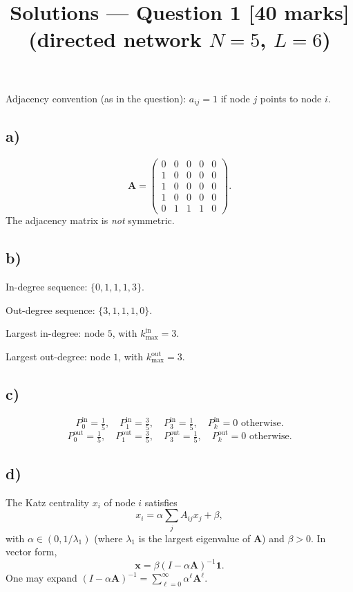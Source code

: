 \documentclass[11pt,a4paper]{article}
\title{Solutions --- Question 1 [40 marks]\\(directed network $N=5$, $L=6$)}
\author{}
\date{}
\begin{document}
\maketitle

\noindent
Adjacency convention (as in the question): $a_{ij} = 1$ if node $j$ points to node $i$.

\subsection*{a)}

\[
  \mathbf{A} =
  \begin{pmatrix}
    0 & 0 & 0 & 0 & 0 \\
    1 & 0 & 0 & 0 & 0 \\
    1 & 0 & 0 & 0 & 0 \\
    1 & 0 & 0 & 0 & 0 \\
    0 & 1 & 1 & 1 & 0
  \end{pmatrix}.
\]
The adjacency matrix is \emph{not} symmetric.

\subsection*{b)}

In-degree sequence: $\{0, 1, 1, 1, 3\}$.

Out-degree sequence: $\{3, 1, 1, 1, 0\}$.

Largest in-degree: node $5$, with $k_{\max}^{\mathrm{in}} = 3$.

Largest out-degree: node $1$, with $k_{\max}^{\mathrm{out}} = 3$.

\subsection*{c)}

\[
  P_0^{\mathrm{in}} = \tfrac{1}{5},\quad
  P_1^{\mathrm{in}} = \tfrac{3}{5},\quad
  P_3^{\mathrm{in}} = \tfrac{1}{5},\quad
  P_k^{\mathrm{in}} = 0 \text{ otherwise}.
\]
\[
  P_0^{\mathrm{out}} = \tfrac{1}{5},\quad
  P_1^{\mathrm{out}} = \tfrac{3}{5},\quad
  P_3^{\mathrm{out}} = \tfrac{1}{5},\quad
  P_k^{\mathrm{out}} = 0 \text{ otherwise}.
\]

\subsection*{d)}

The Katz centrality $x_i$ of node $i$ satisfies
\[
  x_i = \alpha \sum_{j} A_{ij} x_j + \beta,
\]
with $\alpha \in (0, 1/\lambda_1)$ (where $\lambda_1$ is the largest eigenvalue of $\mathbf{A}$) and $\beta > 0$. In vector form,
\[
  \mathbf{x} = \beta (I - \alpha \mathbf{A})^{-1} \mathbf{1}.
\]
One may expand $(I - \alpha \mathbf{A})^{-1} = \sum_{\ell=0}^{\infty} \alpha^{\ell} \mathbf{A}^{\ell}$.
\end{document}

